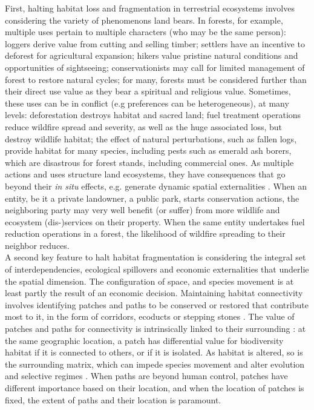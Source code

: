 	First, halting habitat loss and fragmentation in terrestrial ecosystems involves considering the variety of phenomenons land bears. In forests, for example, multiple uses pertain to multiple characters (who may be the same person): loggers derive value from cutting and selling timber; settlers have an incentive to deforest for agricultural expansion; hikers value pristine natural conditions and opportunities of sightseeing; conservationists may call for limited management of forest to restore natural cycles; for many, forests must be considered further than their direct use value as they bear a spiritual and religious value. Sometimes, these uses can be in conflict (e.g preferences can be heterogeneous), at many levels: deforestation destroys habitat and sacred land; fuel treatment operations reduce wildfire spread and severity, as well as the huge associated loss, but destroy wildlife habitat; the effect of natural perturbations, such as fallen logs, provide habitat for many species, including pests such as emerald ash borers, which are disastrous for forest stands, including commercial ones. As multiple actions and uses structure land ecosystems, they have consequences that go beyond their \textit{in situ} effects, e.g. generate dynamic spatial externalities \citep{sanchirico_bioeconomics_1999, costello_optimal_2008, costello_private_2017}. When an entity, be it a private landowner, a public park, starts conservation actions, the neighboring party may very well benefit (or suffer) from more wildlife and ecosystem (dis-)services on their property. When the same entity undertakes fuel reduction operations in a forest, the likelihood of wildfire spreading to their neighbor reduces. 
\\
A second key feature to halt habitat fragmentation is considering the integral set of interdependencies, ecological spillovers and economic externalities that underlie the spatial dimension. The configuration of space, and species movement is at least partly the result of an economic decision. Maintaining habitat connectivity involves identifying patches and paths to be conserved or restored that contribute most to it, in the form of corridors, ecoducts or stepping stones \citep{Turner2005, Turner2011}. The value of patches and paths for connectivity is intrinsically linked to their surrounding : at the same geographic location, a patch has differential value for biodiversity habitat if it is connected to others, or if it is isolated. As habitat is altered, so is the surrounding matrix, which can impede species movement \citep{eycott_meta-analysis_2012, kuefler_conflicting_2010} and alter evolution and selective regimes \citep{cheptou_adaptation_2017}. When paths are beyond human control, patches have different importance based on their location, and when the location of patches is fixed, the extent of paths and their location is paramount. 
